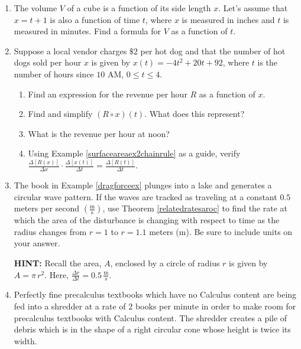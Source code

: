 \begin{enumerate}
\setcounter{enumi}{\value{HW}}


\item The volume $V$ of a cube is a function of its side length $x$.  Let's assume that $x = t + 1$ is also a function of time $t$, where $x$ is measured in inches and $t$ is measured in minutes.  Find a formula for $V$ as a function of $t$.

\item  Suppose a local vendor charges $\$2$ per hot dog and that the number of hot dogs sold per hour $x$ is given by $x(t) = -4t^2+20t+92$, where $t$ is the number of hours since $10$ AM, $0 \leq t \leq 4$.

\begin{enumerate}

\item  Find an expression for the revenue per hour $R$ as a function of $x$.
\item  Find and simplify $\left(R \circ x\right)(t)$.  What does this represent?
\item  What is the revenue per hour at noon?
\item Using Example \ref{surfaceareaex2chainrule} as a guide, verify $\frac{\Delta[R(x)]}{\Delta x} \cdot \frac{\Delta[x(t)]}{\Delta t} = \frac{\Delta[R(t)]}{\Delta t}$.

\end{enumerate}

\item  The book in Example \ref{dragforceex} plunges into a lake and generates a circular wave pattern.  If the waves are tracked as traveling at a constant $0.5$ meters per second $\left( \frac{\text{m}}{\text{s}}\right)$, use Theorem \ref{relatedratesaroc} to find the rate at which the area of the disturbance is changing with respect to time as the radius changes from $r = 1$ to $r = 1.1$ meters (m).  Be sure to include units on your answer.

\smallskip

\textbf{HINT:}  Recall the area, $A$, enclosed by a circle of radius $r$ is given by $A = \pi \, r^2$.  Here, $\frac{\Delta r}{\Delta t} = 0.5 \, \frac{\text{m}}{\text{s}}$.  

\item   Perfectly fine precalculus textbooks which have no Calculus content are being fed into a shredder at a rate of 2 books per minute in order to make room for precalculus textbooks with Calculus content.  The shredder creates a pile of debris which is in the shape of a right circular cone whose height is twice its width. 


\end{enumerate}

